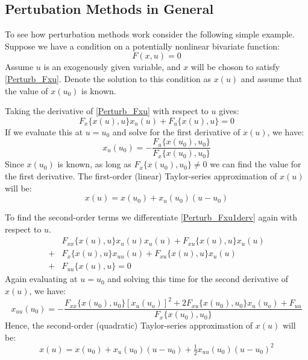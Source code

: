 \documentclass[letterpaper,12pt]{article}
\theoremstyle{definition}
\begin{document}
\begin{spacing}{1.5}
\section{Pertubation Methods in General} \label{Perturb_General}
	To see how perturbation methods work consider the following simple example.  Suppose we have a condition on a potentially nonlinear bivariate function:
	\begin{equation} \label{Perturb_Fxu}
	 F(x,u) = 0
	\end{equation}
	Assume $u$ is an exogenously given variable, and $x$ will be choson to satisfy \eqref{Perturb_Fxu}.   Denote the solution to this condition as $x(u)$ and assume that the value of $x(u_0)$ is known.

	Taking the derivative of \eqref{Perturb_Fxu} with respect to $u$ gives:
	\begin{equation} \label{Perturb_Fxu1derv}
	 F_x\{x(u),u\} x_u(u) + F_u\{x(u),u\}= 0
	\end{equation}
	If we evaluate this at $u=u_0$ and solve for the first derivative of $x(u)$, we have:
	\begin{equation} \label{Perturb_linear}
	x_u(u_0) = -\frac{F_u\{x(u_0),u_0\}}{F_x\{x(u_0),u_0\}}
	\end{equation}
	Since $x(u_0)$ is known, as long as $F_x\{x(u_0),u_0\} \ne 0$ we can find the value for the first derivative.
	The first-order (linear) Taylor-series approximation of $x(u)$ will be:
	\begin{equation} \label{Perturb_Taylor1}
	x(u) = x(u_0) + x_u(u_0)(u-u_0)
	\end{equation}

	To find the second-order terms we differentiate \eqref{Perturb_Fxu1derv} again with respect to $u$.
	\begin{equation} \label{Perturb_Fxu2derv}
	\begin{split}
	 & F_{xx}\{x(u),u\} x_u(u) x_u(u) + F_{xu}\{x(u),u\}x_u(u) \\
	 + & F_{x}\{x(u),u\} x_{uu}(u) + F_{xu}\{x(u),u\} x_u(u) \\
	 + & F_{uu}\{x(u),u\} =0
	\end{split}
	\end{equation}
	Again evaluating at $u=u_0$ and solving this time for the second derivative of $x(u)$, we have:
	\begin{equation} \label{Perturb_quad}
	x_{uu}(u_0) = -\frac{F_{xx}\{x(u_0),u_0\}[x_u(u_o)]^2 + 2F_{xu}\{x(u_0),u_0\}x_u(u_o) + F_{uu}}{F_x\{x(u_0),u_0\}}
	\end{equation}
	Hence, the second-order (quadratic) Taylor-series approximation of $x(u)$ will be:
	\begin{equation} \label{Perturb_Taylor2}
	x(u) = x(u_0) + x_u(u_0)(u-u_0) + \tfrac{1}{2} x_{uu}(u_0)(u-u_0)^2
	\end{equation}


\end{spacing}
\end{document}
